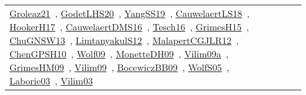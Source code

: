 {\begin{longtable}{lp{3cm}>{\raggedright\arraybackslash}p{6cm}>{\raggedright\arraybackslash}p{6cm}>{\raggedright\arraybackslash}p{8cm}}
\href{../works/Groleaz21.pdf}{Groleaz21}~\cite{Groleaz21}, \href{../works/GodetLHS20.pdf}{GodetLHS20}~\cite{GodetLHS20}, \href{../works/YangSS19.pdf}{YangSS19}~\cite{YangSS19}, \href{../works/CauwelaertLS18.pdf}{CauwelaertLS18}~\cite{CauwelaertLS18}, \href{../works/HookerH17.pdf}{HookerH17}~\cite{HookerH17}, \href{../works/CauwelaertDMS16.pdf}{CauwelaertDMS16}~\cite{CauwelaertDMS16}, \href{../works/Tesch16.pdf}{Tesch16}~\cite{Tesch16}, \href{../works/GrimesH15.pdf}{GrimesH15}~\cite{GrimesH15}, \href{../works/ChuGNSW13.pdf}{ChuGNSW13}~\cite{ChuGNSW13}, \href{../works/LimtanyakulS12.pdf}{LimtanyakulS12}~\cite{LimtanyakulS12}, \href{../works/MalapertCGJLR12.pdf}{MalapertCGJLR12}~\cite{MalapertCGJLR12}, \href{../works/ChenGPSH10.pdf}{ChenGPSH10}~\cite{ChenGPSH10}, \href{../works/Wolf09.pdf}{Wolf09}~\cite{Wolf09}, \href{../works/MonetteDH09.pdf}{MonetteDH09}~\cite{MonetteDH09}, \href{../works/Vilim09a.pdf}{Vilim09a}~\cite{Vilim09a}, \href{../works/GrimesHM09.pdf}{GrimesHM09}~\cite{GrimesHM09}, \href{../works/Vilim09.pdf}{Vilim09}~\cite{Vilim09}, \href{../works/BocewiczBB09.pdf}{BocewiczBB09}~\cite{BocewiczBB09}, \href{../works/WolfS05.pdf}{WolfS05}~\cite{WolfS05}, \href{../works/Laborie03.pdf}{Laborie03}~\cite{Laborie03}, \href{../works/Vilim03.pdf}{Vilim03}~\cite{Vilim03}\\

\end{longtable}}
